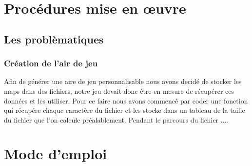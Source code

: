 \documentclass[a4paper, 11pt]{article}
\title{\myfont {Robots programmables}}
\author{\huge {COTREZ Léo}\and \huge {ORNIACKI Thomas}\and \\Université Paris-VIII, Saint-Denis, France\and \\Licence 2 Informatique}
\date{Premier Semestre 2018}
\begin{document}
\maketitle

\newpage
\tableofcontents

\newpage
\section{Procédures mise en \oe uvre}
\subsection{Les problèmatiques}
\subsubsection{Création de l'air de jeu}
Afin de générer une aire de jeu personnalisable nous avons decidé de stocker les maps dans des fichiers, notre jeu devait donc être en mesure de récupérer ces données et les utiliser. Pour ce faire nous avons commencé par coder une fonction qui récupére chaque caractère du fichier et les stocke dans un tableau de la taille du fichier que l'on calcule préalablement. Pendant le parcours du fichier ....

\newpage
\section{Mode d'emploi}
\end{document}
